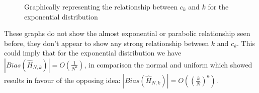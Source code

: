 \documentclass[12pt]{report}
\begin{document}
\begin{figure}
\caption{Graphically representing the relationship between $c_{k}$ and $k$ for the exponential distribution} \label{c_k_expo}
\end{figure}

These graphs do not show the almost exponential or parabolic relationship seen before, they don't appear to show any strong relationship between $k$ and $c_{k}$. This could imply that for the exponential distribution we have $|Bias (\hat{H}_{N, k}) | = O \left( \frac{1}{N^{a}} \right)$, in comparison the normal and uniform which showed results in favour of the opposing idea: $| Bias (\hat{H}_{N, k}) | = O\left( \left( \frac{k}{N} \right)^{a} \right)$.
\end{document}
